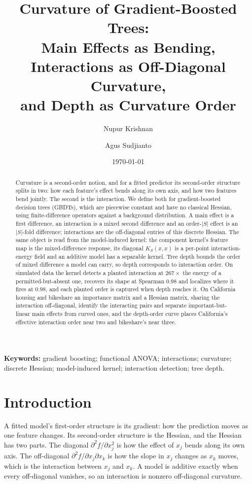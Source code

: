 \documentclass[11pt]{article}
\title{Curvature of Gradient-Boosted Trees:\\
Main Effects as Bending, Interactions as Off-Diagonal Curvature,\\
and Depth as Curvature Order}
\author{Nupur Krishnan \and Agus Sudjianto}
\date{\today}
\begin{document}
\maketitle

\begin{abstract}
Curvature is a second-order notion, and for a fitted predictor its second-order
structure splits in two: how each feature's effect bends along its own axis, and
how two features bend jointly. The second is the interaction. We define both for
gradient-boosted decision trees (GBDTs), which are piecewise constant and have no
classical Hessian, using finite-difference operators against a background
distribution. A main effect is a first difference, an interaction is a mixed
second difference and an order-$|S|$ effect is an $|S|$-fold difference;
interactions are the off-diagonal entries of this discrete Hessian. The same
object is read from the model-induced kernel: the component kernel's feature map
is the mixed-difference response, its diagonal $K_S(x,x)$ is a per-point
interaction-energy field and an additive model has a separable kernel. Tree depth
bounds the order of mixed difference a model can carry, so depth corresponds to
interaction order. On simulated data the kernel detects a planted interaction at
$267\times$ the energy of a permitted-but-absent one, recovers its shape at
Spearman $0.98$ and localizes where it fires at $0.98$, and each planted order is
captured when depth reaches it. On California housing and bikeshare an
importance matrix and a Hessian matrix, sharing the interaction off-diagonal,
identify the interacting pairs and separate important-but-linear main effects from
curved ones, and the depth-order curve places California's effective interaction
order near two and bikeshare's near three.
\end{abstract}

\medskip
\noindent\textbf{Keywords:} gradient boosting; functional ANOVA; interactions;
curvature; discrete Hessian; model-induced kernel; interaction detection; tree depth.

\section{Introduction}

A fitted model's first-order structure is its gradient: how the prediction moves
as one feature changes. Its second-order structure is the Hessian, and the
Hessian has two parts. The diagonal $\partial^2 f/\partial x_j^2$ is how the
effect of $x_j$ bends along its own axis. The off-diagonal
$\partial^2 f/\partial x_j\partial x_k$ is how the slope in $x_j$ changes as $x_k$
moves, which is the interaction between $x_j$ and $x_k$. A model is additive
exactly when every off-diagonal vanishes, so an interaction is nonzero
off-diagonal curvature.
\end{document}
